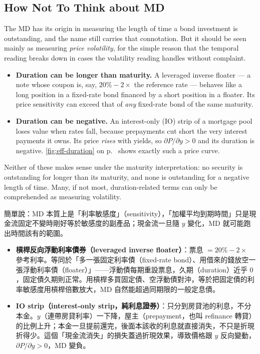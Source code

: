 \subsection{How Not To Think about MD}


The MD has its origin in measuring the length of time a bond investment is outstanding, and the name still carries that connotation.
But it should be seen mainly as measuring \emph{price volatility}, for the simple reason that the temporal reading breaks down in cases the volatility reading handles without complaint.

\suppstart
\begin{itemize}[itemsep=0.35em]
	\item \textbf{Duration can be longer than maturity.}
	      A leveraged inverse floater --- a note whose coupon is, say, $20\% - 2\times$ the reference rate --- behaves like a long position in a fixed-rate bond financed by a short position in a floater.
	      Its price sensitivity can exceed that of \emph{any} fixed-rate bond of the same maturity.
	\item \textbf{Duration can be negative.}
	      An interest-only (IO) strip of a mortgage pool loses value when rates fall, because prepayments cut short the very interest payments it owns.
	      Its price \emph{rises} with yields, so $\partial P/\partial y > 0$ and its duration is negative.
	      \autoref{fig:eff-duration} on p.~\pageref{fig:eff-duration} shows exactly such a price curve.
\end{itemize}
\suppend

Neither of these makes sense under the maturity interpretation: no security is outstanding for longer than its maturity, and none is outstanding for a negative length of time.
Many, if not most, duration-related terms can only be comprehended as measuring volatility.

\suppstart
\begin{remark}
	簡單說：MD 本質上是「利率敏感度」（sensitivity），「加權平均到期時間」只是現金流固定不變時剛好等於敏感度的副產品；現金流一旦隨 $y$ 變化，MD 就可能跑出時間該有的範圍。

	\begin{itemize}[nosep]
		\item \textbf{槓桿反向浮動利率債券（leveraged inverse floater）}：票息 $=20\%-2\times$ 參考利率。等同於「多一張固定利率債（fixed-rate bond）、用借來的錢放空一張浮動利率債（floater）」——浮動債每期重設票息，久期（duration）近乎 $0$，固定債久期則正常。用槓桿多買固定債、空浮動債對沖，等於把固定債的利率敏感度用槓桿倍數放大，MD 自然能超過同期限的一般定息債。
		\item \textbf{IO strip（interest-only strip，純利息證券）}：只分到房貸池的利息，不分本金。$y$（連帶房貸利率）一下降，屋主（prepayment，也叫 refinance 轉貸）的比例上升；本金一旦提前還完，後面本該收的利息就直接消失，不只是折現折得少。這個「現金流消失」的損失蓋過折現效果，導致價格跟 $y$ 反向變動，$\partial P/\partial y>0$，MD 變負。
	\end{itemize}
\end{remark}

